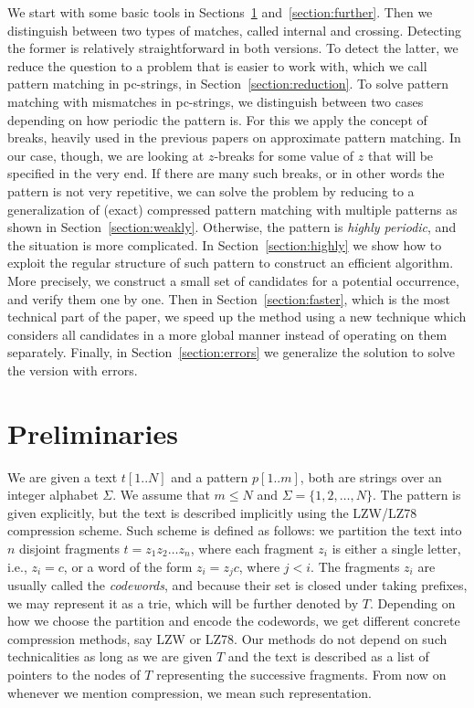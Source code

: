 \documentclass[runningheads]{llncs}
\begin{document}
We start with some basic tools in Sections~\ref{section:preliminaries} and~\ref{section:further}. Then we distinguish between two types of matches, called internal and crossing. Detecting the former is relatively straightforward in both versions. To detect the latter, we reduce the question to a problem that is easier to work with, which we call pattern matching in pc-strings, in Section~\ref{section:reduction}. To solve pattern matching with mismatches in pc-strings, we distinguish between
two cases depending on how periodic the pattern is. For this we apply the concept of breaks, heavily used in the previous papers on approximate pattern matching. In our case, though,
we are looking at $z$-breaks for some value of $z$ that will be specified in the very end. If there are many such breaks, or in other words the pattern is not very repetitive, we
can solve the problem by reducing to a generalization of (exact) compressed pattern matching with multiple patterns as shown in Section~\ref{section:weakly}. Otherwise, the pattern is {\it highly periodic},
and the situation is more complicated. In Section~\ref{section:highly} we show how to exploit the regular structure of such pattern to construct an efficient algorithm.
More precisely, we construct a small set of candidates for a potential occurrence, and verify them one by one. Then
in Section~\ref{section:faster}, which is the most technical part of the paper, we speed up the method using a new technique which considers all candidates in a more global manner instead of operating on them separately.
Finally, in Section~\ref{section:errors} we generalize the solution to solve the version with errors.

\section{Preliminaries}
\label{section:preliminaries}

We are given a text $t[1..N]$ and a pattern $p[1..m]$, both are strings over an integer alphabet $\Sigma$. We assume that $m\leq N$ and $\Sigma=\{1,2,\ldots,N\}$. The pattern is given explicitly, but the text is described implicitly using the LZW/LZ78 compression scheme. Such scheme is defined as follows: we partition the text into $n$ disjoint fragments $t=z_{1} z_{2} \ldots z_{n}$, where each fragment $z_{i}$ is either a single letter, i.e., $z_{i}=c$, or a word of the form $z_{i}=z_{j} c$, where $j<i$. The fragments $z_{i}$ are usually called the {\it codewords}, and because their set is closed under taking prefixes, we may represent it as a trie, which will be further denoted by $T$. Depending on how we choose the partition and encode the codewords, we get different concrete compression methods, say LZW or LZ78. Our methods do not depend on such technicalities as long as we are given $T$ and the text is described as a list of pointers to the nodes of $T$ representing the successive fragments. From now on whenever we mention compression, we mean such representation.
\end{document}
